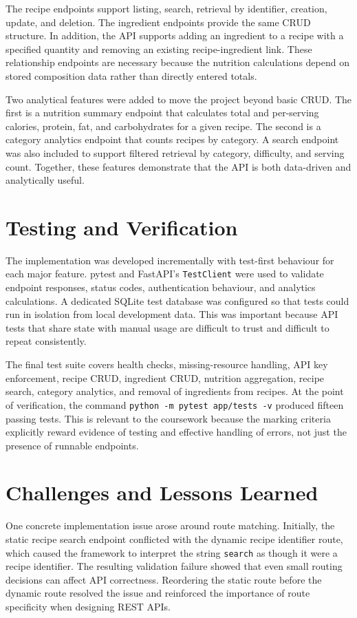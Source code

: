 \documentclass[11pt,a4paper]{article}
\begin{document}
The recipe endpoints support listing, search, retrieval by identifier, creation, update, and deletion. The ingredient endpoints provide the same CRUD structure. In addition, the API supports adding an ingredient to a recipe with a specified quantity and removing an existing recipe-ingredient link. These relationship endpoints are necessary because the nutrition calculations depend on stored composition data rather than directly entered totals.

Two analytical features were added to move the project beyond basic CRUD. The first is a nutrition summary endpoint that calculates total and per-serving calories, protein, fat, and carbohydrates for a given recipe. The second is a category analytics endpoint that counts recipes by category. A search endpoint was also included to support filtered retrieval by category, difficulty, and serving count. Together, these features demonstrate that the API is both data-driven and analytically useful.

\section{Testing and Verification}
The implementation was developed incrementally with test-first behaviour for each major feature. pytest and FastAPI's \texttt{TestClient} were used to validate endpoint responses, status codes, authentication behaviour, and analytics calculations. A dedicated SQLite test database was configured so that tests could run in isolation from local development data. This was important because API tests that share state with manual usage are difficult to trust and difficult to repeat consistently.

The final test suite covers health checks, missing-resource handling, API key enforcement, recipe CRUD, ingredient CRUD, nutrition aggregation, recipe search, category analytics, and removal of ingredients from recipes. At the point of verification, the command \texttt{python -m pytest app/tests -v} produced fifteen passing tests. This is relevant to the coursework because the marking criteria explicitly reward evidence of testing and effective handling of errors, not just the presence of runnable endpoints.

\section{Challenges and Lessons Learned}
One concrete implementation issue arose around route matching. Initially, the static recipe search endpoint conflicted with the dynamic recipe identifier route, which caused the framework to interpret the string \texttt{search} as though it were a recipe identifier. The resulting validation failure showed that even small routing decisions can affect API correctness. Reordering the static route before the dynamic route resolved the issue and reinforced the importance of route specificity when designing REST APIs.
\end{document}

